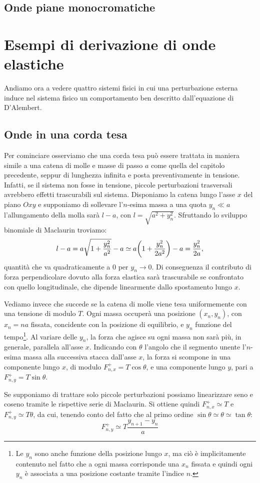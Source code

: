     \subsection{Onde piane monocromatiche}
    
    
\section{Esempi di derivazione di onde elastiche}
    Andiamo ora a vedere quattro sistemi fisici in cui una perturbazione esterna induce nel sistema fisico un comportamento ben descritto dall'equazione di D'Alembert.
    \subsection{Onde in una corda tesa}
        Per cominciare osserviamo che una corda tesa pu\`o essere trattata in maniera simile a una catena di molle e masse di passo $a$ come quella del capitolo precedente, seppur di lunghezza infinita e posta preventivamente in tensione. Infatti, se il sistema non fosse in tensione, piccole perturbazioni trasversali avrebbero effetti trascurabili sul sistema. Disponiamo la catena lungo l'asse $x$ del piano $Oxy$ e supponiamo di sollevare l'$n$-esima massa a una quota $y_n\ll a$ l'allungamento della molla sar\`a $l-a$, con $l=\sqrt{a^2+y_n^2}$. Sfruttando lo sviluppo binomiale di Maclaurin troviamo:
            $$l-a=a\sqrt{1+\frac{y_n^2}{a^2}}-a\simeq a\qty(1+\frac{y_n^2}{2a^2})-a=\frac{y_n^2}{2a},$$
        quantit\`a che va quadraticamente a $0$ per $y_n\to0$. Di conseguenza il contributo di forza perpendicolare dovuto alla forza elastica sar\`a trascurabile se confrontato con quello longitudinale, che dipende linearmente dallo spostamento lungo $x$.
        \par Vediamo invece che succede se la catena di molle viene tesa uniformemente con una tensione di modulo $T$. Ogni massa occuper\`a una posizione $(x_n,y_n)$, con $x_n=na$ fissata, concidente con la posizione di equilibrio, e $y_n$ funzione del tempo\footnote{Le $y_n$ sono anche funzione della posizione lungo $x$, ma ci\`o \`e implicitamente contenuto nel fatto che a ogni massa corrisponde una $x_n$ fissata e quindi ogni $y_n$ \`e associata a una posizione costante tramite l'indice $n$.}. Al variare delle $y_n$, la forza che agisce su ogni massa non sar\`a pi\`u, in generale, parallela all'asse $x$. Indicando con $\theta$ l'angolo che il segmento unente l'$n$-esima massa alla successiva stacca dall'asse $x$, la forza si scompone in una componente lungo $x$, di modulo $F_{n,x}^+=T\cos\theta$, e una componente lungo $y$, pari a $F_{n,y}^+=T\sin\theta$.
        \par Se supponiamo di trattare solo piccole perturbazioni possiamo linearizzare seno e coseno tramite le rispettive serie di Maclaurin. Si ottiene quindi $F_{n,x}^+\simeq T$ e $F_{n,y}^+\simeq T\theta$, da cui, tenendo conto del fatto che al primo ordine $\sin\theta\simeq\theta\simeq\tan\theta$:
            $$F_{n,y}^+\simeq T\frac{y_{n+1}-y_n}{a}$$

